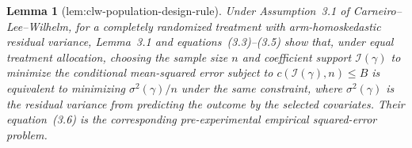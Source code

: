 \documentclass{article}
\newtheorem{lemma}{Lemma}
\begin{document}
\begin{lemma}[lem:clw-population-design-rule]\label{lem:clw-population-design-rule}
Under Assumption~3.1 of Carneiro--Lee--Wilhelm, for a completely randomized treatment with arm-homoskedastic residual variance, Lemma~3.1 and equations~(3.3)--(3.5) show that, under equal treatment allocation, choosing the sample size \(n\) and coefficient support \(\mathcal I(\gamma)\) to minimize the conditional mean-squared error subject to \(c(\mathcal I(\gamma),n)\le B\) is equivalent to minimizing \(\sigma^2(\gamma)/n\) under the same constraint, where \(\sigma^2(\gamma)\) is the residual variance from predicting the outcome by the selected covariates. Their equation~(3.6) is the corresponding pre-experimental empirical squared-error problem.
\end{lemma}
\end{document}
